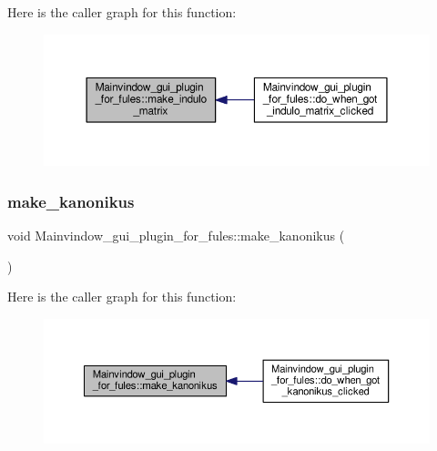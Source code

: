 Here is the caller graph for this function\+:\nopagebreak
\begin{figure}[H]
\begin{center}
\leavevmode
\includegraphics[width=350pt]{classMainvindow__gui__plugin__for__fules_a69be0da66c49005cb7178c140b53dccb_icgraph}
\end{center}
\end{figure}
\mbox{\label{classMainvindow__gui__plugin__for__fules_ad57320bcd6e0f8353254601919b980b9}} 
\subsubsection{\texorpdfstring{make\+\_\+kanonikus}{make\_kanonikus}}
{\footnotesize\ttfamily void Mainvindow\+\_\+gui\+\_\+plugin\+\_\+for\+\_\+fules\+::make\+\_\+kanonikus (\begin{DoxyParamCaption}{ }\end{DoxyParamCaption})\hspace{0.3cm}{\ttfamily [signal]}}

Here is the caller graph for this function\+:\nopagebreak
\begin{figure}[H]
\begin{center}
\leavevmode
\includegraphics[width=350pt]{classMainvindow__gui__plugin__for__fules_ad57320bcd6e0f8353254601919b980b9_icgraph}
\end{center}
\end{figure}
\mbox{\label{classMainvindow__gui__plugin__for__fules_abfd45e12e05f78b189c4ad00f7fb6930}} 
